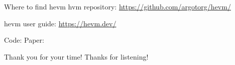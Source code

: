 \documentclass[aspectratio=169]{beamer}
\begin{document}
\begin{frame}[fragile=singleslide]{Where to find hevm}
hvm repository: \url{https://github.com/argotorg/hevm/}

hevm user guide: \url{https://hevm.dev/}
\bigskip

Code: \qquad {}
\qquad \qquad \qquad Paper: \qquad {}




\end{frame}

\begin{frame}{Thank you for your time!}
    Thanks for listening!
\end{frame}


%
\end{document}
